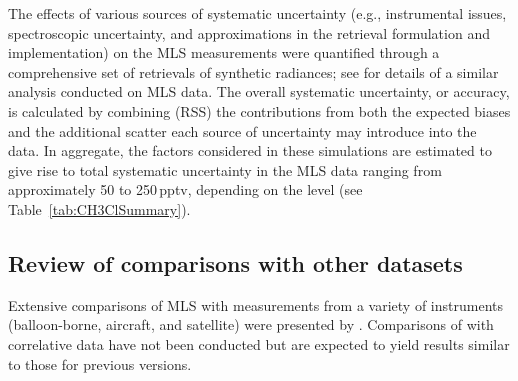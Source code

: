 The effects of various sources of systematic uncertainty (e.g., instrumental issues, spectroscopic uncertainty, and approximations in the retrieval formulation and implementation) on the MLS \thisv {} measurements were quantified through a comprehensive set of retrievals of synthetic radiances; see \citet{SanteeEtal:2013} for details of a similar analysis conducted on MLS \viii {} data. The overall systematic uncertainty, or accuracy, is calculated by combining (RSS) the contributions from both the expected biases and the additional scatter each source of uncertainty may introduce into the data. In aggregate, the factors considered in these simulations are estimated to give rise to total systematic uncertainty in the MLS \thisv {} data ranging from approximately 50 to 250\,pptv, depending on the level (see Table~\ref{tab:CH3ClSummary}).

\subsection{Review of comparisons with other datasets}

Extensive comparisons of MLS \viii {} with measurements from a variety of instruments (balloon-borne, aircraft, and satellite) were presented by \citet{SanteeEtal:2013}. Comparisons of \thisv {} with correlative data have not been conducted but are expected to yield results similar to those for previous versions.

